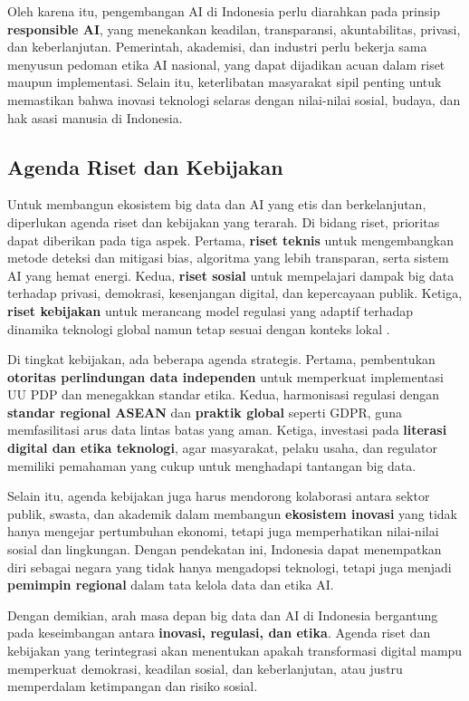 Oleh karena itu, pengembangan AI di Indonesia perlu diarahkan pada prinsip \textbf{responsible AI}, yang menekankan keadilan, transparansi, akuntabilitas, privasi, dan keberlanjutan. Pemerintah, akademisi, dan industri perlu bekerja sama menyusun pedoman etika AI nasional, yang dapat dijadikan acuan dalam riset maupun implementasi. Selain itu, keterlibatan masyarakat sipil penting untuk memastikan bahwa inovasi teknologi selaras dengan nilai-nilai sosial, budaya, dan hak asasi manusia di Indonesia.

\subsection{Agenda Riset dan Kebijakan}

Untuk membangun ekosistem big data dan AI yang etis dan berkelanjutan, diperlukan agenda riset dan kebijakan yang terarah. Di bidang riset, prioritas dapat diberikan pada tiga aspek. Pertama, \textbf{riset teknis} untuk mengembangkan metode deteksi dan mitigasi bias, algoritma yang lebih transparan, serta sistem AI yang hemat energi. Kedua, \textbf{riset sosial} untuk mempelajari dampak big data terhadap privasi, demokrasi, kesenjangan digital, dan kepercayaan publik. Ketiga, \textbf{riset kebijakan} untuk merancang model regulasi yang adaptif terhadap dinamika teknologi global namun tetap sesuai dengan konteks lokal \cite{floridi2018ai}.  

Di tingkat kebijakan, ada beberapa agenda strategis. Pertama, pembentukan \textbf{otoritas perlindungan data independen} untuk memperkuat implementasi UU PDP dan menegakkan standar etika. Kedua, harmonisasi regulasi dengan \textbf{standar regional ASEAN} dan \textbf{praktik global} seperti GDPR, guna memfasilitasi arus data lintas batas yang aman. Ketiga, investasi pada \textbf{literasi digital dan etika teknologi}, agar masyarakat, pelaku usaha, dan regulator memiliki pemahaman yang cukup untuk menghadapi tantangan big data.  

Selain itu, agenda kebijakan juga harus mendorong kolaborasi antara sektor publik, swasta, dan akademik dalam membangun \textbf{ekosistem inovasi} yang tidak hanya mengejar pertumbuhan ekonomi, tetapi juga memperhatikan nilai-nilai sosial dan lingkungan. Dengan pendekatan ini, Indonesia dapat menempatkan diri sebagai negara yang tidak hanya mengadopsi teknologi, tetapi juga menjadi \textbf{pemimpin regional} dalam tata kelola data dan etika AI.  

Dengan demikian, arah masa depan big data dan AI di Indonesia bergantung pada keseimbangan antara \textbf{inovasi, regulasi, dan etika}. Agenda riset dan kebijakan yang terintegrasi akan menentukan apakah transformasi digital mampu memperkuat demokrasi, keadilan sosial, dan keberlanjutan, atau justru memperdalam ketimpangan dan risiko sosial.


